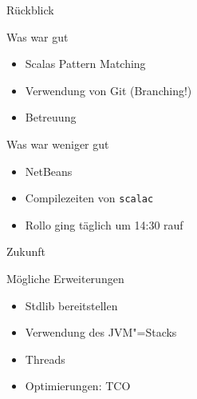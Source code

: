 \documentclass[hyperref={pdfpagelabels=false}]{beamer}
\begin{document}
\begin{frame}{Rückblick}
  \begin{exampleblock}{Was war gut}
    \begin{itemize}
      \item Scalas Pattern Matching
	  \item Verwendung von Git (Branching!)
      \item Betreuung \smiley
    \end{itemize}
  \end{exampleblock}
  \begin{alertblock}{Was war weniger gut}
    \begin{itemize}
      \item NetBeans
      \item Compilezeiten von \texttt{scalac}
      \item Rollo ging täglich um 14:30 rauf \frownie
    \end{itemize}
  \end{alertblock}
\end{frame}

\begin{frame}{Zukunft}
  \begin{block}{Mögliche Erweiterungen}
    \begin{itemize}
      \item Stdlib bereitstellen
      \item Verwendung des JVM"=Stacks
      \item Threads
      \item Optimierungen: TCO
    \end{itemize}
  \end{block}
\end{frame}
\end{document}
